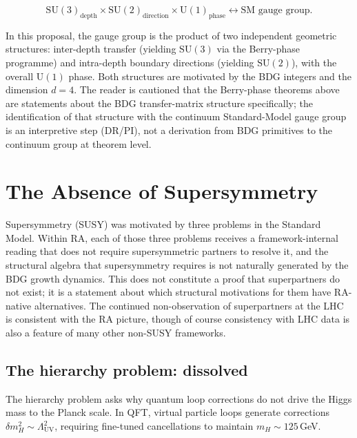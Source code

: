 \documentclass[11pt]{article}
\begin{document}
\begin{equation}
\boxed{\mathrm{SU}(3)_{\mathrm{depth}}\times\mathrm{SU}(2)_{\mathrm{direction}}\times\mathrm{U}(1)_{\mathrm{phase}} \leftrightarrow \text{SM gauge group}.}
\end{equation}

In this proposal, the gauge group is the product of two independent geometric structures: inter-depth transfer (yielding $\mathrm{SU}(3)$ via the Berry-phase programme) and intra-depth boundary directions (yielding $\mathrm{SU}(2)$), with the overall $\mathrm{U}(1)$ phase. Both structures are motivated by the BDG integers and the dimension $d=4$. The reader is cautioned that the Berry-phase theorems above are statements about the BDG transfer-matrix structure specifically; the identification of that structure with the continuum Standard-Model gauge group is an interpretive step (DR/PI), not a derivation from BDG primitives to the continuum group at theorem level.

\section{The Absence of Supersymmetry}
\label{sec:susy}

Supersymmetry (SUSY) was motivated by three problems in the Standard Model. Within RA, each of those three problems receives a framework-internal reading that does not require supersymmetric partners to resolve it, and the structural algebra that supersymmetry requires is not naturally generated by the BDG growth dynamics. This does not constitute a proof that superpartners do not exist; it is a statement about which structural motivations for them have RA-native alternatives. The continued non-observation of superpartners at the LHC is consistent with the RA picture, though of course consistency with LHC data is also a feature of many other non-SUSY frameworks.

\subsection{The hierarchy problem: dissolved}

The hierarchy problem asks why quantum loop corrections do not drive the Higgs mass to the Planck scale. In QFT, virtual particle loops generate corrections $\delta m_H^2\sim\Lambda_{\mathrm{UV}}^2$, requiring fine-tuned cancellations to maintain $m_H\sim 125$\,GeV.
\end{document}
